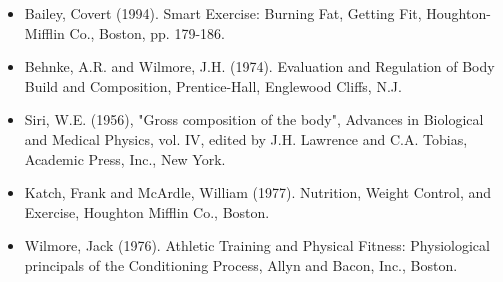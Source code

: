 \documentclass[letterpaper, 12pt]{article}
\begin{document}
	\begin{itemize}
		\item Bailey, Covert (1994). Smart Exercise: Burning Fat, Getting Fit,
		Houghton-Mifflin Co., Boston, pp. 179-186.
		
		\item Behnke, A.R. and Wilmore, J.H. (1974). Evaluation and Regulation of Body
		Build and Composition, Prentice-Hall, Englewood Cliffs, N.J.
		
		\item Siri, W.E. (1956), "Gross composition of the body", Advances in 
		Biological and Medical Physics, vol. IV, edited by J.H. Lawrence and C.A.
		Tobias, Academic Press, Inc., New York.
		
		\item Katch, Frank and McArdle, William (1977). Nutrition, Weight Control, and
		Exercise, Houghton Mifflin Co., Boston.
		
		\item Wilmore, Jack (1976). Athletic Training and Physical Fitness: Physiological
		principals of the Conditioning Process, Allyn and Bacon, Inc., Boston.
	\end{itemize}
\end{document}
